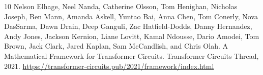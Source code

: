 \documentclass[11pt]{article}
\theoremstyle{definition}
\begin{document}
\begin{thebibliography}{10}
Nelson Elhage, Neel Nanda, Catherine Olsson, Tom Henighan, Nicholas Joseph, Ben Mann, Amanda Askell, Yuntao Bai, Anna Chen, Tom Conerly, Nova DasSarma, Dawn Drain, Deep Ganguli, Zac Hatfield-Dodds, Danny Hernandez, Andy Jones, Jackson Kernion, Liane Lovitt, Kamal Ndousse, Dario Amodei, Tom Brown, Jack Clark, Jared Kaplan, Sam McCandlish, and Chris Olah.
\newblock A Mathematical Framework for Transformer Circuits.
\newblock Transformer Circuits Thread, 2021.
\newblock \url{https://transformer-circuits.pub/2021/framework/index.html}

\end{thebibliography}
\end{document}
